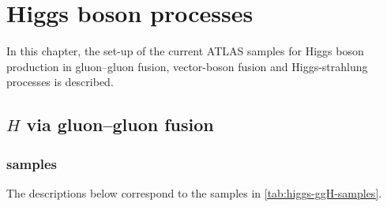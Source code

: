 
\chapter{Higgs boson processes}

In this chapter, the set-up of the current ATLAS samples for Higgs boson production in gluon--gluon fusion, 
vector-boson fusion and Higgs-strahlung processes is described.

\section{$H$ via gluon--gluon fusion}

\subsection*{\texorpdfstring{\POWPY[8]}{Powheg+Pythia8} samples}


The descriptions below correspond to the samples in \cref{tab:higgs-ggH-samples}.


